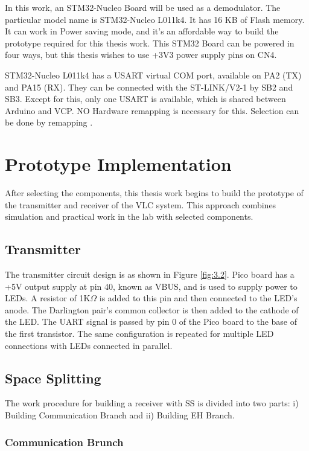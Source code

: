 In this work, an STM32-Nucleo Board will be used as a demodulator. The particular model name is STM32-Nucleo L011k4. It has 16 KB of Flash memory. It can work in Power saving mode, and it's an affordable way to build the prototype required for this thesis work. This STM32 Board can be powered in four ways, but this thesis wishes to use +3V3 power supply pins on CN4.

STM32-Nucleo L011k4 has a \ac{USART} virtual COM port,  available on PA2 (TX) and PA15 (RX). They can be connected with the ST-LINK/V2-1 by SB2 and SB3. Except for this, only one \ac{USART} is available, which is shared between Arduino and VCP. NO Hardware remapping is necessary for this. Selection can be done by remapping \cite{nucleo-l011k4}.


\section{Prototype Implementation}

After selecting the components, this thesis work begins to build the prototype of the transmitter and receiver of the \ac{VLC} system. This approach combines simulation and practical work in the lab with selected components. 

\subsection{Transmitter}

The transmitter circuit design is as shown in Figure \ref{fig:3.2}. Pico board has a +5V output supply at pin 40, known as VBUS, and is used to supply power to LEDs. A resistor of 1K\(\Omega\) is added to this pin and then connected to the LED's anode. The Darlington pair's common collector is then added to the cathode of the LED. The \ac{UART} signal is passed by pin 0 of the Pico board to the base of the first transistor. The same configuration is repeated for multiple LED connections with LEDs connected in parallel.


\subsection{Space Splitting}
The work procedure for building a receiver with \ac{SS} is divided into two parts: i) Building Communication Branch and ii) Building \ac{EH} Branch.

\subsubsection{Communication Brunch}

